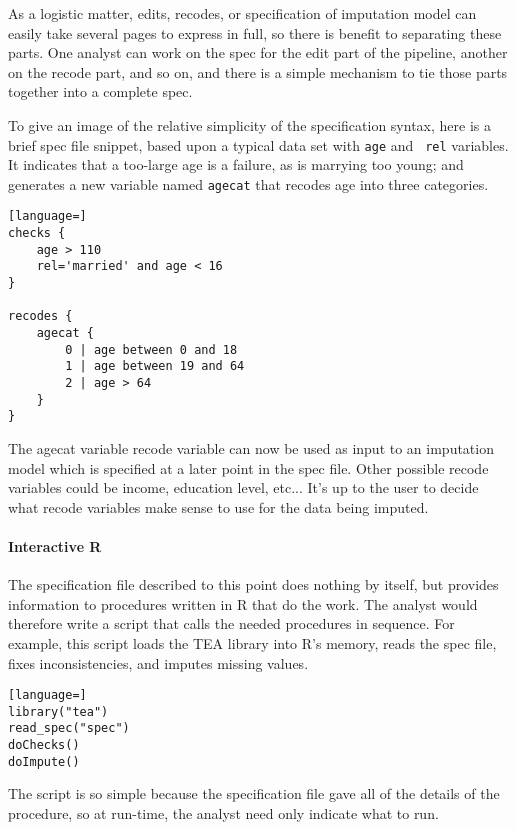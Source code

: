 \documentclass{article}
\begin{document}
As a logistic matter, edits, recodes, or specification of imputation model can easily
take several pages to express in full, so there is benefit to separating these parts.
One analyst can work on the spec for the edit part of the pipeline, another on the recode
part, and so on, and there is a simple mechanism to tie those parts together into a
complete spec.

To give an image of the relative simplicity of the specification syntax,
here is a brief spec file snippet, based upon a typical data set with {\tt age} and {\tt
rel} variables. It indicates that a too-large age is a failure, as is marrying too young;
and generates a new variable named {\tt agecat} that recodes age into three categories.

\begin{lstlisting}[language=]
checks {
    age > 110
    rel='married' and age < 16
}

recodes {
    agecat {
        0 | age between 0 and 18
        1 | age between 19 and 64
        2 | age > 64
    }
}
\end{lstlisting}

The agecat variable recode variable can now be used as input to an imputation model 
which is specified at a later point in the spec file. Other possible recode variables 
could be income, education level, etc... It's up to the user to decide what recode variables 
make sense to use for the data being imputed.

\paragraph{Interactive R}
The specification file described to this point does nothing by itself, but provides
information to procedures written in R that do the work. The analyst would therefore write
a script that calls the needed procedures in sequence. For example, this script loads the
TEA library into R's memory, reads the spec file, fixes inconsistencies, and imputes
missing values.

\begin{lstlisting}[language=]
library("tea")
read_spec("spec")
doChecks()
doImpute()
\end{lstlisting}

The script is so simple because the specification file gave all of the details of the
procedure, so at run-time, the analyst need only indicate what to run.
\end{document}

